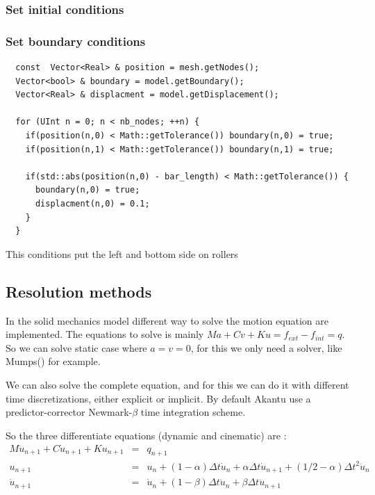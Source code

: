 \documentclass[a4paper,11pt]{book}
\begin{document}
\subsubsection{Set initial conditions}
\subsubsection{Set boundary conditions\label{sect:smm:boundary}}

\begin{verbatim}
  const  Vector<Real> & position = mesh.getNodes();
  Vector<bool> & boundary = model.getBoundary();
  Vector<Real> & displacment = model.getDisplacement();

  for (UInt n = 0; n < nb_nodes; ++n) {
    if(position(n,0) < Math::getTolerance()) boundary(n,0) = true;
    if(position(n,1) < Math::getTolerance()) boundary(n,1) = true;

    if(std::abs(position(n,0) - bar_length) < Math::getTolerance()) {
      boundary(n,0) = true;
      displacment(n,0) = 0.1;
    }
  }
\end{verbatim}

This conditions put the left and bottom side on rollers

\subsection{Resolution methods}
In the  solid mechanics  model different  way to solve  the motion  equation are
implemented.  The equations  to  solve is  mainly  $Ma +  Cv +  Ku  = f_{ext}  -
f_{int} = q$. So we can solve static case where $a = v = 0$, for this we only need a
solver, like Mumps(\cite{mumps}) for example.

We  can also  solve  the complete  equation,  and for  this we  can  do it  with
different time discretizations, either  explicit or implicit.  By default Akantu
use  a  predictor-corrector  Newmark-$\beta$  time integration  scheme.

So the three differentiate equations (dynamic and cinematic) are \cite{curnier92a}:
\begin{eqnarray}
  M \ddot{u}_{n+1} + C \dot{u}_{n+1} + K u_{n+1} &=& q_{n+1} \\
  u_{n+1} &=& u_{n} + (1 - \alpha) \Delta t \dot{u}_{n} + \alpha \Delta t \dot{u}_{n+1} + (1/2 - \alpha) \Delta t^2 \ddot{u}_n \\
  \dot{u}_{n+1} &=& \dot{u}_{n} + (1 - \beta) \Delta t \ddot{u}_{n} + \beta \Delta t \ddot{u}_{n+1}
\end{eqnarray}
\end{document}
